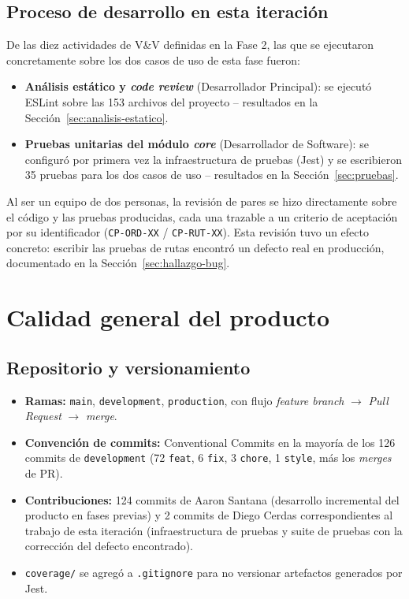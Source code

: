 \documentclass[11pt,a4paper]{article}
\begin{document}
\subsection{Proceso de desarrollo en esta iteración}

De las diez actividades de V\&V definidas en la Fase 2, las que se ejecutaron concretamente
sobre los dos casos de uso de esta fase fueron:

\begin{itemize}[leftmargin=1.3cm]
  \item \textbf{Análisis estático y \textit{code review}} (Desarrollador Principal): se
  ejecutó ESLint sobre las 153 archivos del proyecto -- resultados en la
  Sección~\ref{sec:analisis-estatico}.
  \item \textbf{Pruebas unitarias del módulo \textit{core}} (Desarrollador de Software): se
  configuró por primera vez la infraestructura de pruebas (Jest) y se escribieron 35 pruebas
  para los dos casos de uso -- resultados en la Sección~\ref{sec:pruebas}.
\end{itemize}

Al ser un equipo de dos personas, la revisión de pares se hizo directamente sobre el código
y las pruebas producidas, cada una trazable a un criterio de aceptación por su
identificador (\texttt{CP-ORD-XX} / \texttt{CP-RUT-XX}). Esta revisión tuvo un efecto
concreto: escribir las pruebas de rutas encontró un defecto real en producción, documentado
en la Sección~\ref{sec:hallazgo-bug}.

\section{Calidad general del producto}

\subsection{Repositorio y versionamiento}

\begin{itemize}[leftmargin=1.3cm]
  \item \textbf{Ramas:} \texttt{main}, \texttt{development}, \texttt{production}, con flujo
  \emph{feature branch} $\rightarrow$ \textit{Pull Request} $\rightarrow$ \textit{merge}.
  \item \textbf{Convención de commits:} Conventional Commits en la mayoría de los 126
  commits de \texttt{development} (72 \texttt{feat}, 6 \texttt{fix}, 3 \texttt{chore}, 1
  \texttt{style}, más los \textit{merges} de PR).
  \item \textbf{Contribuciones:} 124 commits de Aaron Santana (desarrollo incremental del
  producto en fases previas) y 2 commits de Diego Cerdas correspondientes al trabajo de esta
  iteración (infraestructura de pruebas y suite de pruebas con la corrección del defecto
  encontrado).
  \item \texttt{coverage/} se agregó a \texttt{.gitignore} para no versionar artefactos
  generados por Jest.
\end{itemize}
\end{document}
